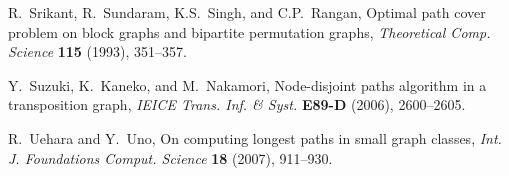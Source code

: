 \documentclass[10pt]{article}
\begin{document}
\begin{thebibliography}{99}
 R.~Srikant, R.~Sundaram, K.S.~Singh, and C.P.~Rangan, Optimal path
cover problem on block graphs and bipartite permutation graphs,
{\it Theoretical Comp. Science} {\bf 115} (1993), 351--357.

  Y.~Suzuki, K.~Kaneko, and M.~Nakamori, Node-disjoint paths
algorithm in a transposition graph, {\it IEICE Trans. Inf. \&
Syst.} {\bf E89-D} (2006), 2600--2605.

  R.~Uehara and Y.~Uno, On computing longest paths in small graph
classes, {\it Int. J. Foundations Comput. Science} {\bf 18}
(2007), 911--930.

\end{thebibliography}
\end{document}
